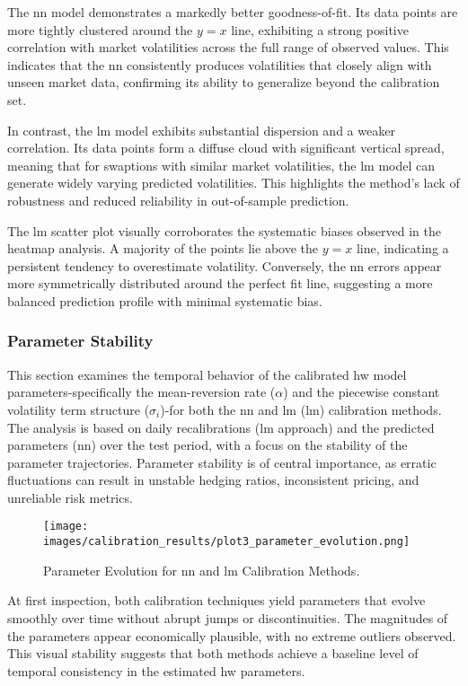 The \ac{nn} model demonstrates a markedly better goodness-of-fit. Its data points are more tightly clustered around the \(y=x\) line, exhibiting a strong positive correlation with market volatilities across the full range of observed values. This indicates that the \ac{nn} consistently produces volatilities that closely align with unseen market data, confirming its ability to generalize beyond the calibration set.

In contrast, the \ac{lm} model exhibits substantial dispersion and a weaker correlation. Its data points form a diffuse cloud with significant vertical spread, meaning that for swaptions with similar market volatilities, the \ac{lm} model can generate widely varying predicted volatilities. This highlights the method's lack of robustness and reduced reliability in out-of-sample prediction.

The \ac{lm} scatter plot visually corroborates the systematic biases observed in the heatmap analysis. A majority of the points lie above the \(y=x\) line, indicating a persistent tendency to overestimate volatility. Conversely, the \ac{nn} errors appear more symmetrically distributed around the perfect fit line, suggesting a more balanced prediction profile with minimal systematic bias.

\subsubsection{Parameter Stability}
This section examines the temporal behavior of the calibrated \ac{hw} model parameters-specifically the mean-reversion rate (\(\alpha\)) and the piecewise constant volatility term structure (\(\sigma_i\))-for both the \ac{nn} and \ac{lm} (\ac{lm}) calibration methods. The analysis is based on daily recalibrations (\ac{lm} approach) and the predicted parameters (\ac{nn}) over the test period, with a focus on the stability  of the parameter trajectories. Parameter stability is of central importance, as erratic fluctuations can result in unstable hedging ratios, inconsistent pricing, and unreliable risk metrics.

\begin{figure}[H]
	\centering
	\texttt{[image: images/calibration\_results/plot3\_parameter\_evolution.png]}
	\caption{Parameter Evolution for \ac{nn} and \ac{lm} Calibration Methods.}
	\label{fig:parameter_evolution}
\end{figure}

At first inspection, both calibration techniques yield parameters that evolve smoothly over time without abrupt jumps or discontinuities. The magnitudes of the parameters appear economically plausible, with no extreme outliers observed. This visual stability suggests that both methods achieve a baseline level of temporal consistency in the estimated \ac{hw} parameters.

